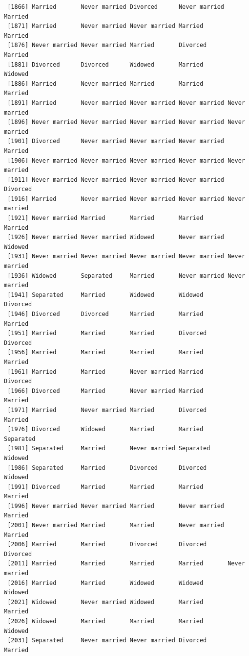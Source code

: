 \documentclass[
  letterpaper,
  DIV=11,
  numbers=noendperiod,
  oneside]{scrartcl}
\begin{document}
\begin{verbatim}
 [1866] Married       Never married Divorced      Never married Married      
 [1871] Married       Never married Never married Married       Married      
 [1876] Never married Never married Married       Divorced      Married      
 [1881] Divorced      Divorced      Widowed       Married       Widowed      
 [1886] Married       Never married Married       Married       Married      
 [1891] Married       Never married Never married Never married Never married
 [1896] Never married Never married Never married Never married Never married
 [1901] Divorced      Never married Never married Never married Married      
 [1906] Never married Never married Never married Never married Never married
 [1911] Never married Never married Never married Never married Divorced     
 [1916] Married       Never married Never married Never married Never married
 [1921] Never married Married       Married       Married       Married      
 [1926] Never married Never married Widowed       Never married Widowed      
 [1931] Never married Never married Never married Never married Never married
 [1936] Widowed       Separated     Married       Never married Never married
 [1941] Separated     Married       Widowed       Widowed       Divorced     
 [1946] Divorced      Divorced      Married       Married       Married      
 [1951] Married       Married       Married       Divorced      Divorced     
 [1956] Married       Married       Married       Married       Married      
 [1961] Married       Married       Never married Married       Divorced     
 [1966] Divorced      Married       Never married Married       Married      
 [1971] Married       Never married Married       Divorced      Married      
 [1976] Divorced      Widowed       Married       Married       Separated    
 [1981] Separated     Married       Never married Separated     Widowed      
 [1986] Separated     Married       Divorced      Divorced      Widowed      
 [1991] Divorced      Married       Married       Married       Married      
 [1996] Never married Never married Married       Never married Married      
 [2001] Never married Married       Married       Never married Married      
 [2006] Married       Married       Divorced      Divorced      Divorced     
 [2011] Married       Married       Married       Married       Never married
 [2016] Married       Married       Widowed       Widowed       Widowed      
 [2021] Widowed       Never married Widowed       Married       Married      
 [2026] Widowed       Married       Married       Married       Widowed      
 [2031] Separated     Never married Never married Divorced      Married      

\end{verbatim}
\end{document}
